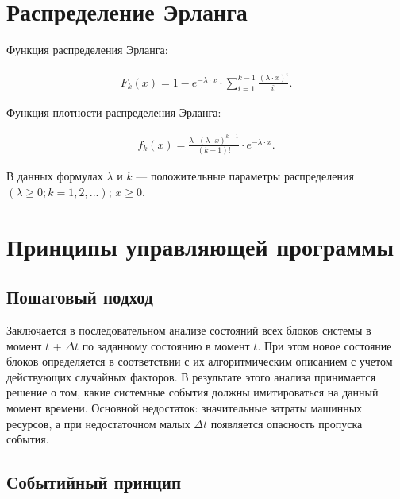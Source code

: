 \documentclass{bmstu}
\begin{document}
\section{Распределение Эрланга}

Функция распределения Эрланга:

\begin{equation}
    \begin{aligned}
        F_k(x) = 1 - e^{-\lambda \cdot x} \cdot \sum_{i = 1}^{k - 1} \frac{(\lambda \cdot x)^i}{i!}.
    \end{aligned}
\end{equation}


Функция плотности распределения Эрланга:

\begin{equation}
    \begin{aligned}
        f_k(x) = \frac{\lambda \cdot (\lambda \cdot x)^{k - 1}}{(k - 1)!} \cdot e^{-\lambda \cdot x}.
    \end{aligned}
\end{equation}

В данных формулах $\lambda$ и $k$ --- положительные параметры распределения $(\lambda \geqslant 0; k = 1, 2, ...)$;
$x \geqslant 0$.

\clearpage

\section{Принципы управляющей программы}

\subsection{Пошаговый подход}

Заключается в последовательном анализе состояний всех блоков системы в момент $t$ + $\Delta t$ по заданному состоянию в момент $t$. При этом новое состояние блоков определяется в соответствии с их алгоритмическим описанием с учетом действующих случайных факторов. В результате этого анализа принимается решение о том, какие системные события должны имитироваться на данный момент времени. Основной недостаток: значительные затраты машинных ресурсов, а при недостаточном малых $\Delta t$ появляется опасность пропуска события.

\subsection{Событийный принцип}
\end{document}
